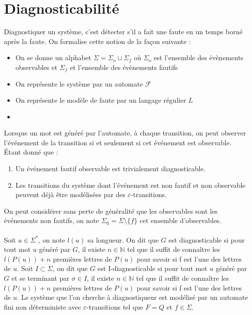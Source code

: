 \documentclass[10pt,a4paper]{article}
\begin{document}
\section{Diagnosticabilit\'e}

Diagnostiquer un syst\`eme, c'est d\'etecter s'il a fait une faute en un temps born\'e apr\`es la faute. On formalise cette notion de la fa\c{c}on suivante :
\begin{itemize}
	\item On se donne un alphabet $\Sigma=\Sigma_o\sqcup\Sigma_f$ o\`u $\Sigma_o$ est l'ensemble des \'ev\`enements observables et $\Sigma_f$ et l'ensemble des \'ev\`enements fautifs
	\item On repr\'esente le syst\`eme par un automate $\mathcal F$
	\item On repr\'esente le mod\`ele de faute par un langage r\'egulier $L$
	\item 
\end{itemize}

Lorsque un mot est généré par l'automate, à chaque transition, on peut observer l’événement de la transition si et seulement si cet événement est observable. Étant donné que :
\begin{enumerate}
\item Un événement fautif observable est trivialement diagnosticable.
\item Les transitions du système dont l'événement est non fautif et non observable peuvent déjà être modélisées par des $\varepsilon$-transitions.
\end{enumerate} 
On peut considérer sans perte de généralité que les observables sont les événements non fautifs, on note $\Sigma_0 = \Sigma \setminus \{f\}$ cet ensemble d'observables.
\paragraph{}
Soit $u \in \Sigma^*$, on note $l(u)$ sa longueur. On dit que $G$ est diagnosticable si pour tout mot $u$ généré par $G$, il existe $n \in \mathbb{N}$ tel que il suffit de connaître les $l(P(u)) + n$ premières lettres de $P(u)$ pour savoir si f est l'une des lettres de $u$. Soit $I \subset \Sigma$, on dit que $G$ est I-diagnosticable si pour tout mot $u$ généré par $G$ et se terminant par $\sigma \in I$, il existe $n \in \mathbb{N}$ tel que il suffit de connaître les $l(P(u)) + n$ premières lettres de $P(u)$ pour savoir si f est l'une des lettres de $u$.
Le système que l'on cherche à diagnostiqueur est modélisé par un automate fini non d\'eterministe avec $\varepsilon$-transitions tel que $F=Q$ et $f\in \Sigma$.
\end{document}
